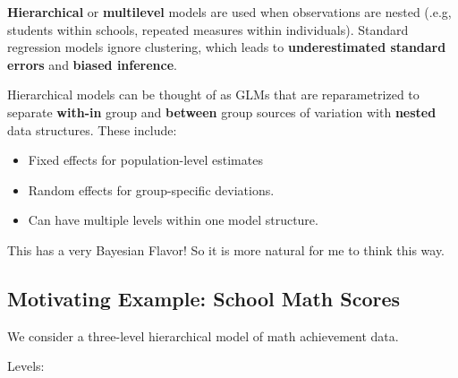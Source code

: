 \documentclass[
  letterpaper,
  DIV=11,
  numbers=noendperiod]{scrreprt}
\providecommand{\tightlist}{%
  \setlength{\itemsep}{0pt}\setlength{\parskip}{0pt}}\usepackage{longtable,booktabs,array}
\begin{document}
\begin{tcolorbox}[enhanced jigsaw, breakable, colbacktitle=quarto-callout-important-color!10!white, left=2mm, colframe=quarto-callout-important-color-frame, opacityback=0, coltitle=black, colback=white, rightrule=.15mm, title=\textcolor{quarto-callout-important-color}{\faExclamation}\hspace{0.5em}{Motivation:}, titlerule=0mm, opacitybacktitle=0.6, leftrule=.75mm, toprule=.15mm, arc=.35mm, bottomtitle=1mm, toptitle=1mm, bottomrule=.15mm]

\textbf{Hierarchical} or \textbf{multilevel} models are used when
observations are nested (.e.g, students within schools, repeated
measures within individuals). Standard regression models ignore
clustering, which leads to \textbf{underestimated standard errors} and
\textbf{biased inference}.

Hierarchical models can be thought of as GLMs that are reparametrized to
separate \textbf{with-in} group and \textbf{between} group sources of
variation with \textbf{nested} data structures. These include:

\begin{itemize}
\tightlist
\item
  Fixed effects for population-level estimates
\item
  Random effects for group-specific deviations.
\item
  Can have multiple levels within one model structure.
\end{itemize}

This has a very Bayesian Flavor! So it is more natural for me to think
this way.

\end{tcolorbox}

\hypertarget{motivating-example-school-math-scores}{%
\subsection*{Motivating Example: School Math
Scores}\label{motivating-example-school-math-scores}}

We consider a three-level hierarchical model of math achievement data.

Levels:
\end{document}
